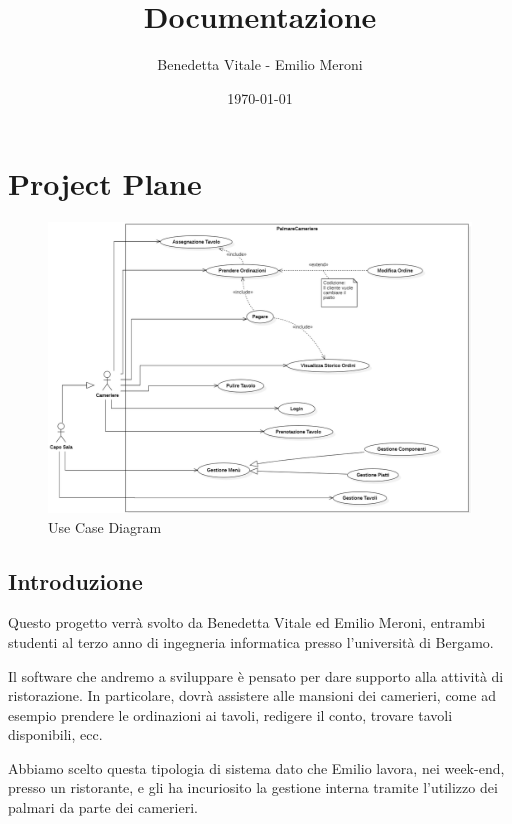 \documentclass{book}
\title{Documentazione}
\author{Benedetta Vitale - Emilio Meroni}
\date{\today}
\begin{document}
\maketitle

\tableofcontents    

\chapter{Project Plane}

\begin{figure}[ht]
        \centering
        \includegraphics[width=1\linewidth]{../../UML/Diagrammi/Use_Case_Diagram.png}
        \caption{Use Case Diagram}
        \label{fig: use_case_diagram}
      \end{figure}

\section{Introduzione}


Questo progetto verrà svolto da Benedetta Vitale ed Emilio Meroni, 
entrambi studenti al terzo anno di ingegneria informatica presso 
l'università di Bergamo.

Il software che andremo a sviluppare è pensato per dare supporto 
alla attività di ristorazione. In particolare, dovrà assistere alle mansioni dei camerieri, come ad esempio prendere le ordinazioni ai tavoli, redigere il conto, trovare tavoli disponibili, ecc.

Abbiamo scelto questa tipologia di sistema dato che Emilio lavora, nei week-end, presso un ristorante, e gli ha incuriosito la gestione interna tramite l'utilizzo dei palmari da parte dei camerieri. 
\end{document}
